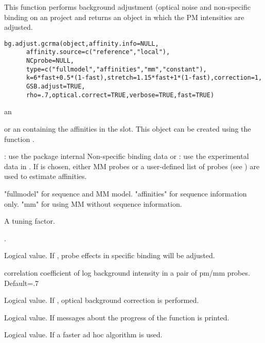 \begin{Description}\relax
This function performs background adjustment (optical noise and
non-specific binding on an 
project and returns an  object in which the PM
intensities are adjusted.
\end{Description}
\begin{Usage}
\begin{verbatim}
bg.adjust.gcrma(object,affinity.info=NULL,
      affinity.source=c("reference","local"),
      NCprobe=NULL,
      type=c("fullmodel","affinities","mm","constant"),
      k=6*fast+0.5*(1-fast),stretch=1.15*fast+1*(1-fast),correction=1,
      GSB.adjust=TRUE,
      rho=.7,optical.correct=TRUE,verbose=TRUE,fast=TRUE)
\end{verbatim}
\end{Usage}
\begin{Arguments}
\begin{ldescription}
\item[\code{object}] an 
\item[\code{affinity.info}]  or an  containing the
affinities in the  slot. This object can be created
using the function .
\item[\code{affinity.source}] : use the package internal
Non-specific binding data or : use the experimental
data in . If  is chosen, either MM probes or a user-defined
list of probes (see ) are used to estimate affinities.
\item[\code{NCprobe}] 
\item[\code{type}] "fullmodel" for sequence and MM model. "affinities" for
sequence information only. "mm" for using MM without sequence
information.
\item[\code{k}] A tuning factor.
\item[\code{stretch}] 
\item[\code{correction}] .
\item[\code{GSB.adjust}] Logical value. If , probe effects in specific binding will
be adjusted.
\item[\code{rho}] correlation coefficient of log background intensity in a pair of pm/mm probes. Default=.7
\item[\code{optical.correct}] Logical value. If , optical
background correction is performed.
\item[\code{verbose}] Logical value. If  messages about the progress of
the function is printed.
\item[\code{fast}] Logical value. If  a faster ad hoc algorithm is
used.
\end{ldescription}
\end{Arguments}
